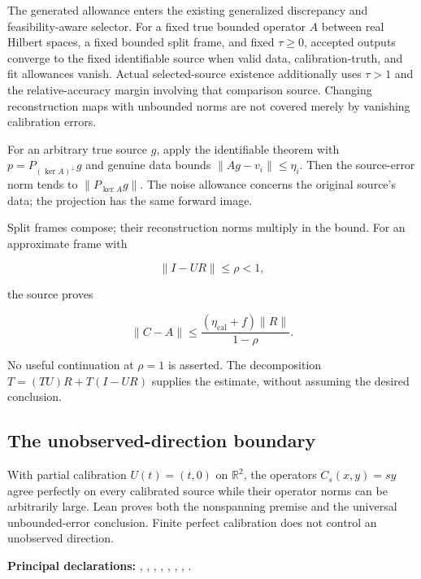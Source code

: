 \documentclass[11pt]{article}
\begin{document}
The generated allowance enters the existing generalized discrepancy and
feasibility-aware selector. For a fixed true bounded operator \(A\)
between real Hilbert spaces, a fixed bounded split frame, and fixed
\(\tau\ge0\), accepted outputs converge to the fixed identifiable source
when valid data, calibration-truth, and fit allowances vanish. Actual
selected-source existence additionally uses \(\tau>1\) and the
relative-accuracy margin involving that comparison source. Changing
reconstruction maps with unbounded norms are not covered merely by
vanishing calibration errors.

For an arbitrary true source \(g\), apply the identifiable theorem with
\(p=P_{(\ker A)^\perp}g\) and genuine data bounds
\(\|Ag-v_i\|\le\eta_i\). Then the source-error norm tends to
\(\|P_{\ker A}g\|\). The noise allowance concerns the original source's
data; the projection has the same forward image.

Split frames compose; their reconstruction norms multiply in the bound.
For an approximate frame with

\[
\|I-UR\|\le\rho<1,
\]

the source proves

\[
\|C-A\|\le\frac{(\eta_{\mathrm{cal}}+f)\|R\|}{1-\rho}.
\]

No useful continuation at \(\rho=1\) is asserted. The decomposition
\(T=(TU)R+T(I-UR)\) supplies the estimate, without assuming the desired
conclusion.

\hypertarget{the-unobserved-direction-boundary}{%
\subsection{The unobserved-direction
boundary}\label{the-unobserved-direction-boundary}}

With partial calibration \(U(t)=(t,0)\) on \(\mathbb R^2\), the
operators \(C_s(x,y)=sy\) agree perfectly on every calibrated source
while their operator norms can be arbitrarily large. Lean proves both
the nonspanning premise and the universal unbounded-error conclusion.
Finite perfect calibration does not control an unobserved direction.

\textbf{Principal declarations:}
\texttt{},
\texttt{},
\texttt{},
\texttt{},
\texttt{},
\texttt{},
\texttt{},
\texttt{}.
\end{document}
